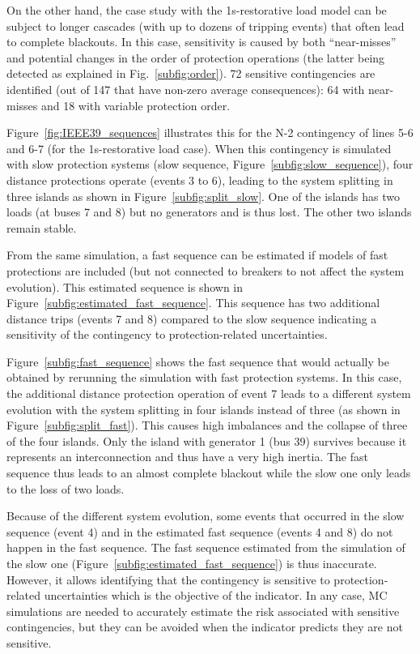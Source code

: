 On the other hand, the case study with the 1s-restorative load model can be subject to longer cascades (with up to dozens of tripping events) that often lead to complete blackouts. In this case, sensitivity is caused by both ``near-misses'' and potential changes in the order of protection operations (the latter being detected as explained in Fig.~\ref{subfig:order}). 72 sensitive contingencies are identified (out of 147 that have non-zero average consequences): 64 with near-misses and 18 with variable protection order.

Figure~\ref{fig:IEEE39_sequences} illustrates this for the N-2 contingency of lines 5-6 and 6-7 (for the 1s-restorative load case). When this contingency is simulated with slow protection systems (slow sequence, Figure~\ref{subfig:slow_sequence}), four distance protections operate (events 3 to 6), leading to the system splitting in three islands as shown in Figure~\ref{subfig:split_slow}. One of the islands has two loads (at buses 7 and 8) but no generators and is thus lost. The other two islands remain stable.

From the same simulation, a fast sequence can be estimated if models of fast protections are included (but not connected to breakers to not affect the system evolution). This estimated sequence is shown in Figure~\ref{subfig:estimated_fast_sequence}. This sequence has two additional distance trips (events 7 and 8) compared to the slow sequence indicating a sensitivity of the contingency to protection-related uncertainties.

Figure~\ref{subfig:fast_sequence} shows the fast sequence that would actually be obtained by rerunning the simulation with fast protection systems. In this case, the additional distance protection operation of event 7 leads to a different system evolution with the system splitting in four islands instead of three (as shown in Figure~\ref{subfig:split_fast}). This causes high imbalances and the collapse of three of the four islands. Only the island with generator 1 (bus 39) survives because it represents an interconnection and thus have a very high inertia. The fast sequence thus leads to an almost complete blackout while the slow one only leads to the loss of two loads.

Because of the different system evolution, some events that occurred in the slow sequence (event 4) and in the estimated fast sequence (events 4 and 8) do not happen in the fast sequence. The fast sequence estimated from the simulation of the slow one (Figure~\ref{subfig:estimated_fast_sequence}) is thus inaccurate. However, it allows identifying that the contingency is sensitive to protection-related uncertainties which is the objective of the indicator. In any case, MC simulations are needed to accurately estimate the risk associated with sensitive contingencies, but they can be avoided when the indicator predicts they are not sensitive.

